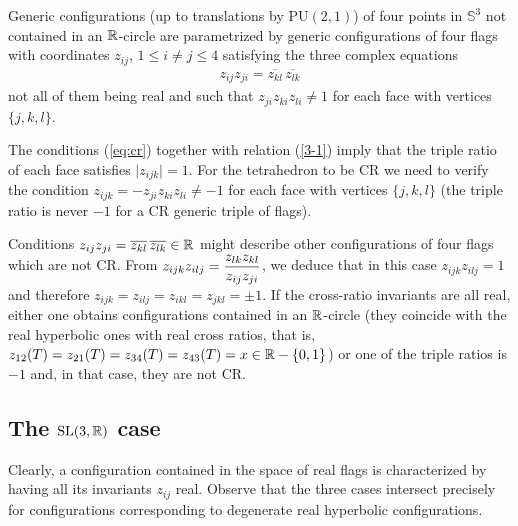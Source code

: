 \begin{proposition}\label{prop:generic}
Generic configurations (up to translations by $\mathrm{PU}(2,1)$) of four points
in ${\mathbb S}^3$ not contained in an $\mathbb{R}$-circle are parametrized
by generic configurations of four flags
with coordinates $z_{ij}$,  $1\leq i\neq j\leq 4$ satisfying  the three complex equations
\begin{eqnarray}\label{eq:cr}
z_{ij}z_{ji}=\overline {z_{kl}}\, \overline{z_{lk}}
\end{eqnarray}
not all of them being real
and such that  $z_{ji}z_{ki}z_{li}\neq 1$ for each face with vertices $\{ j,k,l\}$.
\end{proposition}
The conditions (\ref{eq:cr}) together with relation (\ref{3-1}) imply that the triple ratio of each face satisfies
$
\vert z_{ijk} \vert = 1.
$
For the tetrahedron to be
CR we need to verify the condition   $z_{ijk}=-z_{ji}z_{ki}z_{li}\neq -1$ for each face with vertices $\{ j,k,l\}$
(the triple ratio is never $-1$ for a CR generic triple of flags).
\medskip\par
Conditions $z_{ij}z_{ji}=\overline {z_{kl}}\, \overline{z_{lk}} \in \mathbb{R}$ might describe other
configurations of four flags which are not CR. From $z_{ijk}z_{ilj} = \Frac{z_{lk}z_{kl}}{z_{ij}z_{ji}}$,
we deduce that in this case
$z_{ijk}z_{ilj}=1$ and therefore $z_{ijk} = z_{ilj} = z_{ikl} = z_{jkl}=\pm 1$.  If the cross-ratio invariants are all real, either
one obtains configurations contained in an $\mathbb{R}$-circle (they coincide with the real hyperbolic ones with real cross ratios, that is,
$ z_{12}(T) = z_{21}(T)=z_{34}(T)=z_{43}(T)=x\in \mathbb{R}- \{0,1\}$)
or one of the triple ratios is $-1$ and, in that case, they are not CR.


\subsection{The $\textrm{SL}(3,\mathbb{R})$ case}\label{SLR}

Clearly, a configuration contained in the space of real flags is characterized by having all its
invariants $z_{ij}$ real.  Observe that the three cases intersect precisely for configurations corresponding to degenerate real
hyperbolic configurations.



